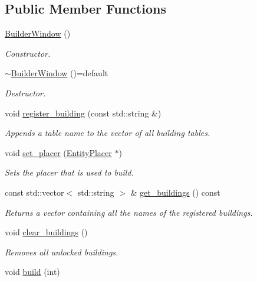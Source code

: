 \subsection*{Public Member Functions}
\begin{DoxyCompactItemize}
\item 
\hyperlink{class_builder_window_af03a3f27f3a1025f1d992e62b6549631}{Builder\+Window} ()
\begin{DoxyCompactList}\small\item\em Constructor. \end{DoxyCompactList}\item 
\hyperlink{class_builder_window_a974a89e16f9c2ede36b2a8dddaac334e}{$\sim$\+Builder\+Window} ()=default
\begin{DoxyCompactList}\small\item\em Destructor. \end{DoxyCompactList}\item 
void \hyperlink{class_builder_window_a0c6d38cbbcf6725e0ac6257306cceba7}{register\+\_\+building} (const std\+::string \&)
\begin{DoxyCompactList}\small\item\em Appends a table name to the vector of all building tables. \end{DoxyCompactList}\item 
void \hyperlink{class_builder_window_a3b3c1fe120624d0109cd8714ad7b3e09}{set\+\_\+placer} (\hyperlink{class_entity_placer}{Entity\+Placer} $\ast$)
\begin{DoxyCompactList}\small\item\em Sets the placer that is used to build. \end{DoxyCompactList}\item 
const std\+::vector$<$ std\+::string $>$ \& \hyperlink{class_builder_window_a6427ac456e5ce78ca3058c2355bab90f}{get\+\_\+buildings} () const 
\begin{DoxyCompactList}\small\item\em Returns a vector containing all the names of the registered buildings. \end{DoxyCompactList}\item 
void \hyperlink{class_builder_window_aa21ded0717c9698b7a71a00d5f3460c0}{clear\+\_\+buildings} ()
\begin{DoxyCompactList}\small\item\em Removes all unlocked buildings. \end{DoxyCompactList}\item 
void \hyperlink{class_builder_window_a8fb26ae5886f86ab21a1a3e1dc9b2b98}{build} (int)

\end{DoxyCompactItemize}
